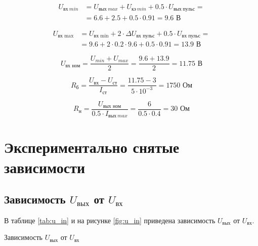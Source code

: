 \begin{displaymath}
\begin{aligned}
	U_{\text{вх}\ min} &= U_{\text{вых}\ max} + U_{\text{кэ}\ min} + 0.5 \cdot U_{\text{вых}\ пульс} = \\ &= 6.6 + 2.5 + 0.5 \cdot 0.91 = 9.6 \text{ В}
\end{aligned}
\end{displaymath}

\begin{displaymath}
\begin{aligned}
	U_\text{вх\ max} &= U_\text{вх\ min} + 2 \cdot \Delta U_\text{вх\ пульс} + 0.5 \cdot U_\text{вх\ пульс} = \\ &= 9.6 + 2 \cdot 0.2 \cdot 9.6 + 0.5 \cdot 0.91 = 13.9 \text{ В}
\end{aligned}
\end{displaymath}

\begin{displaymath}
	U_\text{вх\ ном} = \frac{U_{min} + U_{max}}{2} = \frac{9.6 + 13.9}{2} = 11.75 \text{ В}
\end{displaymath}

\begin{displaymath}
	R_\text{б} = \frac{U_\text{вх} - U_\text{ст}}{I_\text{ст}} = \frac{11.75 - 3}{5 \cdot 10^{-3}} = 1750 \text{ Ом}
\end{displaymath}

\begin{displaymath}
	R_\text{н} = \frac{U_\text{вых ном}}{0.5 \cdot I_{\text{вых}\ max}} = \frac{6}{0.5 \cdot 0.4} = 30 \text{ Ом}
\end{displaymath}

\newpage

\section{Экспериментально снятые зависимости}

\subsection{Зависимость $U_\text{вых}$ от $U_\text{вх}$}

В таблице \ref{tab:u_in} и на рисунке \ref{fig:u_in} приведена зависимость $U_\text{вых}$ от $U_\text{вх}$.

\begin{table}[H]
\begin{center}
	\caption{Зависимость $U_\text{вых}$ от $U_\text{вх}$}
	\label{tab:u_in}
	\def\tabcolsep{40pt}
\end{center}
\end{table}

